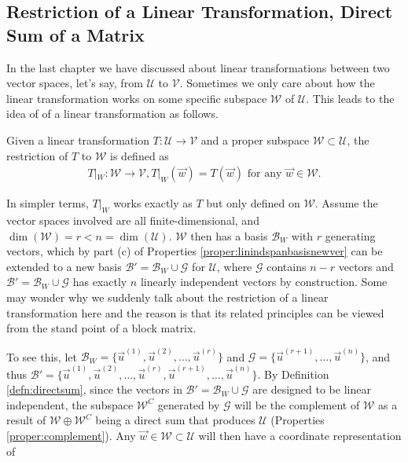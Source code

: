 \subsection{Restriction of a Linear Transformation, Direct Sum of a Matrix}
In the last chapter we have discussed about linear transformations between two vector spaces, let's say, from $\mathcal{U}$ to $\mathcal{V}$. Sometimes we only care about how the linear transformation works on some specific subspace $\mathcal{W}$ of $\mathcal{U}$. This leads to the idea of  of a linear transformation as follows.
\begin{defn}
Given a linear transformation $T: \mathcal{U} \to \mathcal{V}$ and a proper subspace $\mathcal{W} \subset \mathcal{U}$, the restriction of $T$ to $\mathcal{W}$ is defined as
\begin{align*}
T|_W: \mathcal{W} \to \mathcal{V}, T|_W(\vec{w}) = T(\vec{w}) \text{ for any $\vec{w} \in \mathcal{W}$.}
\end{align*}
\end{defn}
In simpler terms, $T|_W$ works exactly as $T$ but only defined on $\mathcal{W}$. Assume the vector spaces involved are all finite-dimensional, and $\dim(\mathcal{W}) = r < n = \dim(\mathcal{U})$. $\mathcal{W}$ then has a basis $\mathcal{B}_W$ with $r$ generating vectors, which by part (c) of Properties \ref{proper:linindspanbasisnewver} can be extended to a new basis $\mathcal{B}' = \mathcal{B}_W \cup \mathcal{G}$ for $\mathcal{U}$, where $\mathcal{G}$ contains $n - r$  vectors and $\mathcal{B}' = \mathcal{B}_W \cup \mathcal{G}$ has exactly $n$ linearly independent vectors by construction. Some may wonder why we suddenly talk about the restriction of a linear transformation here and the reason is that its related principles can be viewed from the stand point of a block matrix.\par
To see this, let $\mathcal{B}_W = \{\vec{u}^{(1)}, \vec{u}^{(2)}, \ldots, \vec{u}^{(r)}\}$ and $\mathcal{G} = \{\vec{u}^{(r+1)}, \ldots, \vec{u}^{(n)}\}$, and thus $\mathcal{B}' = \{\vec{u}^{(1)}, \vec{u}^{(2)}, \ldots, \vec{u}^{(r)}, \vec{u}^{(r+1)}, \ldots, \vec{u}^{(n)}\}$. By Definition \ref{defn:directsum}, since the vectors in $\mathcal{B}' = \mathcal{B}_W \cup \mathcal{G}$ are designed to be linear independent, the subspace $\mathcal{W}^C$ generated by $\mathcal{G}$ will be the complement of $\mathcal{W}$ as a result of $\mathcal{W} \oplus \mathcal{W}^C$ being a direct sum that produces $\mathcal{U}$ (Properties \ref{proper:complement}). Any $\vec{w} \in \mathcal{W} \subset \mathcal{U}$ will then have a coordinate representation of
